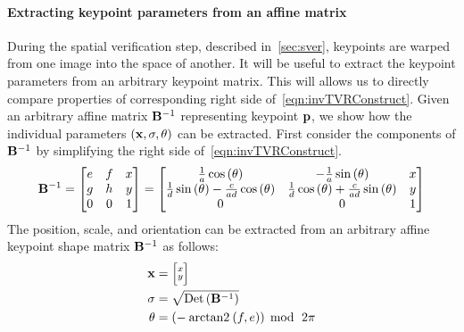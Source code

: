        \paragraph{Extracting keypoint parameters from an affine matrix}
        During the spatial verification step, described in~\cref{sec:sver}, keypoints are warped from one image
        into the space of another. It will be useful to extract the keypoint parameters from an arbitrary keypoint
        matrix. This will allows us to directly compare properties of corresponding right side
        of~\cref{eqn:invTVRConstruct}. Given an arbitrary affine matrix $\mathbf{B}^{-1}$ representing keypoint $\mathbf{p}$,
        we show how the individual parameters $(\mathbf{x}, \sigma, \theta)$ can be extracted. First consider the components
        of $\mathbf{B}^{-1}$ by simplifying the right side of~\cref{eqn:invTVRConstruct}.
        \begin{equation}\label{eqn:ArbInvRVTMat}
            \mathbf{B}^{-1} = 
             \left[ \begin{matrix} 
            e & f & x\\
            g & h & y\\
            0 & 0 & 1
             \end{matrix} \right]  = 
             \left[ \begin{matrix} 
            \frac{1}{a} \cos{(\theta )}                                 & -\frac{1}{a} \sin{(\theta )}                                & x\\
            \frac{1}{d} \sin{(\theta )} - \frac{c}{a d} \cos{(\theta )} & \frac{1}{d} \cos{(\theta )} + \frac{c}{a d} \sin{(\theta )} & y\\
            0                                                           & 0                                                           & 1
             \end{matrix} \right] 
        \end{equation}
        The position, scale, and orientation can be extracted from an arbitrary affine keypoint shape matrix
        $\mathbf{B}^{-1}$ as follows:
        \begin{equation}\label{eqn:affinewarp}
            \begin{aligned}
                \mathbf{x}     &=  \Bigl[\negthinspace \begin{smallmatrix} x\\y \end{smallmatrix} \negthinspace \Bigr]  \\
                \sigma  &= \sqrt{\mathbin{\textrm{Det}}\left(\mathbf{B}^{-1}\right)}\\
                \theta    &= \left(-\mathbin{\operatorname{arctan2}}\left(f, e\right)\right)\; \operatorname{mod}{} \;\,2\pi
            \end{aligned}
        \end{equation}


\newcommand{\annotscoreop}{\opname{K_{\tt annot}}}
\newcommand{\amechscoreop}{\opname{K_{\csum}}}
\newcommand{\fmechscoreop}{\opname{K_{\nsum}}}

